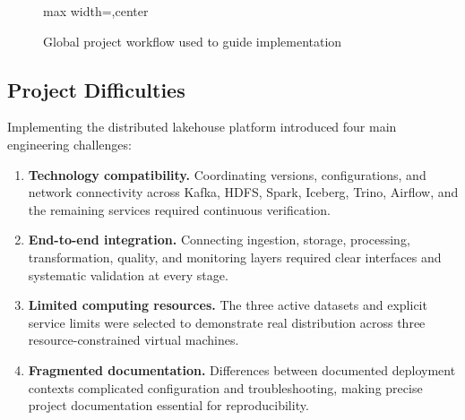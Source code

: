 \begin{figure}[H]
\begin{adjustbox}{max width=\textwidth,center}
    \end{adjustbox}
    \caption{Global project workflow used to guide implementation}
    \label{fig:project-workflow}
\end{figure}

\clearpage
\subsection{Project Difficulties}
Implementing the distributed lakehouse platform introduced four main engineering challenges:

\begin{enumerate}
    \item \textbf{Technology compatibility.} Coordinating versions, configurations, and network connectivity across Kafka, HDFS, Spark, Iceberg, Trino, Airflow, and the remaining services required continuous verification.
    \item \textbf{End-to-end integration.} Connecting ingestion, storage, processing, transformation, quality, and monitoring layers required clear interfaces and systematic validation at every stage.
    \item \textbf{Limited computing resources.} The three active datasets and explicit service limits were selected to demonstrate real distribution across three resource-constrained virtual machines.
    \item \textbf{Fragmented documentation.} Differences between documented deployment contexts complicated configuration and troubleshooting, making precise project documentation essential for reproducibility.
\end{enumerate}

